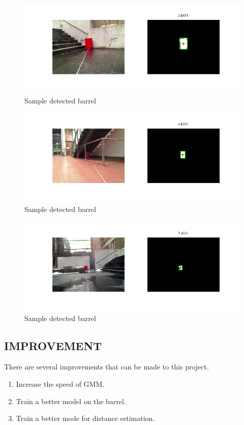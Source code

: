 \documentclass[twoside]{article}
\begin{document}
\begin{multicols}{2}
\begin{figure}[H]
  \centering
  \includegraphics[width=\columnwidth]{t20.png}
    \caption{Sample detected barrel}
    \label{fig:t20}
\end{figure}

\begin{figure}[H]
  \centering
  \includegraphics[width=\columnwidth]{t30.png}
    \caption{Sample detected barrel}
    \label{fig:t30}
\end{figure}

\begin{figure}[H]
  \centering
  \includegraphics[width=\columnwidth]{t40.png}
    \caption{Sample detected barrel}
    \label{fig:t40}
\end{figure}

\subsection{IMPROVEMENT}
There are several improvements that can be made to this project.
\begin{enumerate}
\item Increase the speed of GMM.
\item Train a better model on the barrel.
\item Train a better mode for distance estimation.
\end{enumerate}


\end{multicols}
\end{document}
